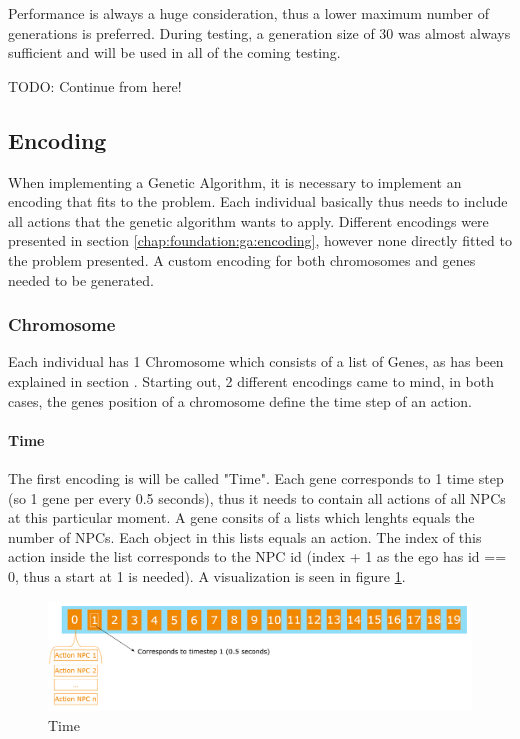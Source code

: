 Performance is always a huge consideration, thus a lower maximum number of generations is preferred. During testing, a generation size of 30 was almost always sufficient and will be used in all of the coming testing.


TODO: Continue from here!
\subsection{Encoding}
When implementing a Genetic Algorithm, it is necessary to implement an encoding that fits to the problem. Each individual basically thus needs to include all actions that the genetic algorithm wants to apply. Different encodings were presented in section \ref{chap:foundation:ga:encoding}, however none directly fitted to the problem presented. A custom encoding for both chromosomes and genes needed to be generated.

\subsubsection{Chromosome}
Each individual has 1 Chromosome which consists of a list of Genes, as has been explained in section . Starting out, 2 different encodings came to mind, in both cases, the genes position of a chromosome define the time step of an action.

\paragraph{Time}
The first encoding is will be called "Time". Each gene corresponds to 1 time step (so 1 gene per every 0.5 seconds), thus it needs to contain all actions of all NPCs at this particular moment. A gene consits of a lists which lenghts equals the number of NPCs. Each object in this lists equals an action. The index of this action inside the list corresponds to the NPC id (index + 1 as the ego has id == 0, thus a start at 1 is needed). A visualization is seen in figure \ref{figure:encoding:chromosome:time}.

\begin{figure}[ht] 
	\includegraphics[width=1\linewidth]{figures/time_encoding}
	\caption{Time}
	\label{figure:encoding:chromosome:time}
\end{figure}

